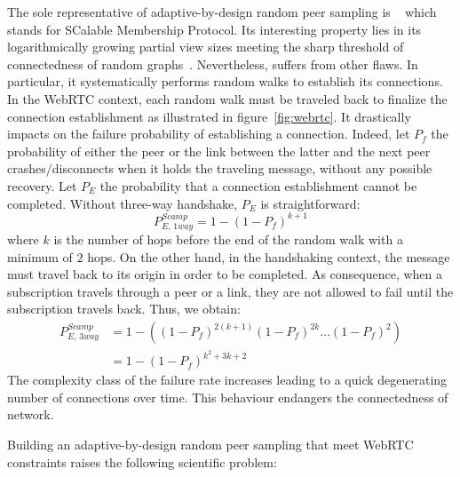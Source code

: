 The sole representative of adaptive-by-design random peer sampling is
\SCAMP{}~\cite{ganesh2001scamp,ganesh2003peer} which stands for
SCalable Membership Protocol. Its interesting property lies in its
logarithmically growing partial view sizes meeting the sharp threshold
of connectedness of random
graphs~\cite{erdos1959random}. Nevertheless, \SCAMP{} suffers from
other flaws. In particular, it systematically performs random walks to
establish its connections. In the WebRTC context, each random walk
must be traveled back to finalize the connection establishment as
illustrated in figure~\ref{fig:webrtc}. It drastically impacts on the
\SCAMP{} failure probability of establishing a connection. Indeed, let
$P_f$ the probability of either the peer or the link between the
latter and the next peer crashes/disconnects when it holds the
traveling message, without any possible recovery. Let $P_E$ the
probability that a connection establishment cannot be
completed. Without three-way handshake, $P_E$ is straightforward:
\begin{equation} P_{E,\,1way}^{Scamp}=1-(1- P_f)^{k+1} \end{equation} where $k$
is the number of hops before the end of the random walk with a minimum of $2$
hops. On the other hand, in the handshaking context, the message must travel
back to its origin in order to be completed. As consequence, when a
subscription travels through a peer or a link, they are not allowed to fail
until the subscription travels back. Thus, we obtain:
\begin{align} P_{E,\,3way}^{Scamp} &=1 - ((1-P_f)^{2(k+1)} (1-P_f)^{2k}
                                     \ldots (1-P_f)^2) \nonumber \\
                                   &=1-(1-P_f)^{k^2+3k+2}
\end{align}
The complexity class of the \SCAMP{} failure rate increases leading to a quick
degenerating number of connections over time. This behaviour endangers the
connectedness of network.

Building an adaptive-by-design random peer sampling that meet WebRTC
constraints raises the following scientific problem:

